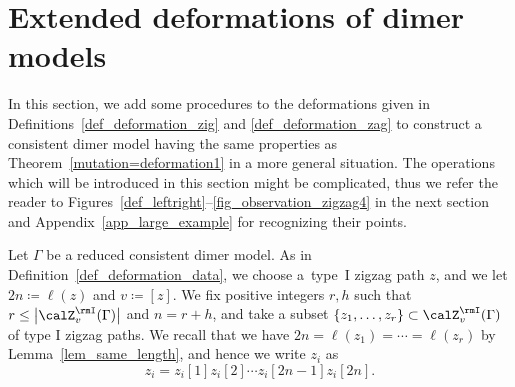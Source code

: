 \section{Extended deformations of dimer models}\label{sec_def_exdeform}

In this section, we add some procedures to the deformations given in Definitions~\ref{def_deformation_zig} and \ref{def_deformation_zag}
to construct a consistent dimer model having the same properties as Theorem~\ref{mutation=deformation1} in a more general situation.
The operations which will be introduced in this section might be complicated, thus we refer the reader to Figures~\ref{def_leftright}--\ref{fig_observation_zigzag4}
in the next section and Appendix~\ref{app_large_example} for recognizing their points.

\begin{setting}\label{def_deformation_exdata}
Let $\Gamma$ be a reduced consistent dimer model.
As in Definition~\ref{def_deformation_data}, we choose a~type~I zigzag path $z$, and we let $2n\coloneqq\ell(z)$ and $v\coloneqq [z]$.
We fix positive integers $r, h$ such that $r\le \big|\calZ_v^\rmI(\Gamma)\big|$ and $n=r+h$,
and take a subset $\{z_1,\dots,z_r\}\subset\calZ_v^\rmI(\Gamma)$ of type I zigzag paths.
We recall that we have $2n=\ell(z_1)=\cdots=\ell(z_r)$ by Lemma~\ref{lem_same_length}, and hence we write $z_i$ as
\begin{displaymath}
z_i=z_i[1]z_i[2]\cdots z_i[2n-1]z_i[2n].
\end{displaymath}


\end{setting}
